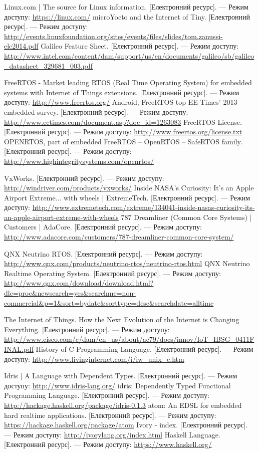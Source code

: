 \documentclass[oneside,14pt,a4paper,final]{myextreport}
\newcommand{\eresource}[2]{#1. [Електронний ресурс]. --- Режим доступу: \url{#2}}
\begin{document}
\begin{thebibliography}{00}
    \eresource{Linux.com | The source for Linux information}{https://linux.com/}
    \eresource{microYocto and the Internet of Tiny}{http://events.linuxfoundation.org/sites/events/files/slides/tom.zanussi-elc2014.pdf}
    \eresource{Galileo Feature Sheet}{http://www.intel.com/content/dam/support/us/en/documents/galileo/sb/galileo\_datasheet\_329681\_003.pdf}

    \eresource{FreeRTOS - Market leading RTOS (Real Time Operating System) for embedded systems with Internet of Things extensions}{http://www.freertos.org/}
    \eresource{Android, FreeRTOS top EE Times' 2013 embedded survey}{http://www.eetimes.com/document.asp?doc\_id=1263083}
    \eresource{FreeRTOS License}{http://www.freertos.org/license.txt}
    \eresource{OPENRTOS, part of embedded FreeRTOS -- OpenRTOS -- SafeRTOS family}{http://www.highintegritysystems.com/openrtos/}

    \eresource{VxWorks}{http://windriver.com/products/vxworks/}
    \eresource{Inside NASA's Curiosity: It's an Apple Airport Extreme... with wheels | ExtremeTech}{http://www.extremetech.com/extreme/134041-inside-nasas-curiosity-its-an-apple-airport-extreme-with-wheels}
    \eresource{787 Dreamliner (Common Core Systems) | Customers | AdaCore}{http://www.adacore.com/customers/787-dreamliner-common-core-system/}

    \eresource{QNX Neutrino RTOS}{http://www.qnx.com/products/neutrino-rtos/neutrino-rtos.html}
    \eresource{QNX Neutrino Realtime Operating System}{http://www.qnx.com/download/download.html?dlc=proc&newsearch=yes&searchme=non-commercial&p=1&sort=bydate&sorttype=desc&searchdate=alltime}

    \eresource{The Internet of Things. How the Next Evolution of the Internet is Changing Everything}{http://www.cisco.com/c/dam/en\_us/about/ac79/docs/innov/IoT\_IBSG\_0411FINAL.pdf}
    \eresource{History of C Programming Language}{http://www.livinginternet.com/i/iw\_unix\_c.htm}

    \eresource{Idris | A Language with Dependent Types}{http://www.idris-lang.org/}
    \eresource{idris: Dependently Typed Functional Programming Language}{http://hackage.haskell.org/package/idris-0.1.3}
    \eresource{atom: An EDSL for embedded hard realtime applications}{https://hackage.haskell.org/package/atom}
    \eresource{Ivory - index}{http://ivorylang.org/index.html}
    \eresource{Haskell Language}{https://www.haskell.org/}


\end{thebibliography}
\end{document}
